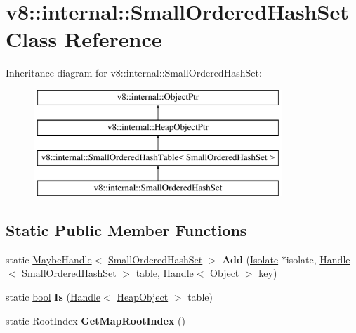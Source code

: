 \hypertarget{classv8_1_1internal_1_1SmallOrderedHashSet}{}\section{v8\+:\+:internal\+:\+:Small\+Ordered\+Hash\+Set Class Reference}
\label{classv8_1_1internal_1_1SmallOrderedHashSet}
Inheritance diagram for v8\+:\+:internal\+:\+:Small\+Ordered\+Hash\+Set\+:\begin{figure}[H]
\begin{center}
\leavevmode
\includegraphics[height=4.000000cm]{classv8_1_1internal_1_1SmallOrderedHashSet}
\end{center}
\end{figure}
\subsection*{Static Public Member Functions}
\begin{DoxyCompactItemize}
\item 
\mbox{\label{classv8_1_1internal_1_1SmallOrderedHashSet_a594ede058592454bc8de7f2d6e332714}} 
static \mbox{\hyperlink{classv8_1_1internal_1_1MaybeHandle}{Maybe\+Handle}}$<$ \mbox{\hyperlink{classv8_1_1internal_1_1SmallOrderedHashSet}{Small\+Ordered\+Hash\+Set}} $>$ {\bfseries Add} (\mbox{\hyperlink{classv8_1_1internal_1_1Isolate}{Isolate}} $\ast$isolate, \mbox{\hyperlink{classv8_1_1internal_1_1Handle}{Handle}}$<$ \mbox{\hyperlink{classv8_1_1internal_1_1SmallOrderedHashSet}{Small\+Ordered\+Hash\+Set}} $>$ table, \mbox{\hyperlink{classv8_1_1internal_1_1Handle}{Handle}}$<$ \mbox{\hyperlink{classv8_1_1internal_1_1Object}{Object}} $>$ key)
\item 
\mbox{\label{classv8_1_1internal_1_1SmallOrderedHashSet_a0acc3ded7d0a830a7a1d023a9cb6cac7}} 
static \mbox{\hyperlink{classbool}{bool}} {\bfseries Is} (\mbox{\hyperlink{classv8_1_1internal_1_1Handle}{Handle}}$<$ \mbox{\hyperlink{classv8_1_1internal_1_1HeapObject}{Heap\+Object}} $>$ table)
\item 
\mbox{\label{classv8_1_1internal_1_1SmallOrderedHashSet_a1c8ea018936da5a0513b4574024e8968}} 
static Root\+Index {\bfseries Get\+Map\+Root\+Index} ()
\end{DoxyCompactItemize}
